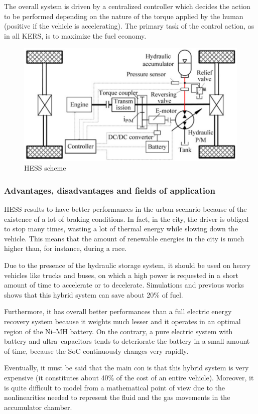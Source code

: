 \documentclass[11pt]{article}
\begin{document}
The overall system is driven by a centralized controller which decides the action to be performed depending on the nature of the torque applied by the human (positive if the vehicle is accelerating). The primary task of the control action, as in all KERS, is to maximize the fuel economy.

\begin{figure}[H]
\centering
\includegraphics[width=.6\textwidth]{Images/State_of_the_art/HESS Scheme.PNG}
\caption{HESS scheme}
\label{HESS scheme}
\end{figure}
\subsubsection{Advantages, disadvantages and fields of application}

HESS results to have better performances in the urban scenario because of the existence of a lot of braking conditions. In fact, in the city, the driver is obliged to stop many times, wasting a lot of thermal energy while slowing down the vehicle. This means that the amount of renewable energies in the city is much higher than, for instance, during a race. 

Due to the presence of the hydraulic storage system, it should be used on heavy vehicles like trucks and buses, on which a high power is requested in a short amount of time to accelerate or to decelerate. Simulations and previous works shows that this hybrid system can save about 20\% of fuel.

Furthermore, it has overall better performances than a full electric energy recovery system because it weights much lesser and it operates in an optimal region of the Ni--MH battery. On the contrary, a pure electric system with battery and ultra--capacitors tends to deteriorate the battery in a small amount of time, because the SoC continuously changes very rapidly.

Eventually, it must be said that the main con is that this hybrid system is very expensive (it constitutes about 40\% of the cost of an entire vehicle). Moreover, it is quite difficult to model from a mathematical point of view due to the nonlinearities needed to represent the fluid and the gas movements in the accumulator chamber.
\end{document}
